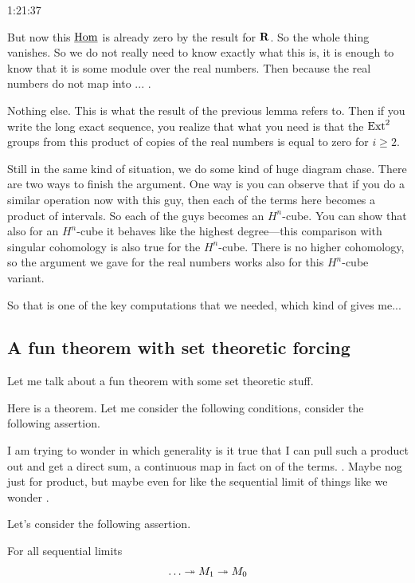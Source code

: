 \begin{unfinished}{1:21:37}
\begin{sketch}
But now this $\operatorname{\underline{Hom}}$ is already zero by the result for $\mathbf R$. So the whole thing vanishes. 
So we do not really need to know exactly what this is, it is enough to know that it is some module over the real numbers. Then because the real numbers do not map into ... .

\end{sketch}


Nothing else. This is what the result of the previous lemma refers to. Then if you write the long exact sequence, you realize that what you need is that the $\operatorname{Ext}^2$ groups from this product of copies of the real numbers is equal to zero for $i \geq 2$.

Still in the same kind of situation, we do some kind of huge diagram chase. There are two ways to finish the argument. One way is you can observe that if you do a similar operation now with this guy, then each of the terms here becomes a product of intervals. So each of the guys becomes an $H^n$-cube.
You can show that also for an $H^n$-cube it behaves like the highest degree---this comparison with singular cohomology is also true for the $H^n$-cube. There is no higher cohomology, so the argument we gave for the real numbers works also for this $H^n$-cube variant.

So that is one of the key computations that we needed, which kind of gives me...

\subsection{A fun theorem with set theoretic forcing}

Let me talk about a fun theorem with some set theoretic stuff.

Here is a theorem. Let me consider the following conditions, consider the following assertion.

I am trying to wonder in which generality is it true that I can pull such a product out and get a direct sum, a continuous map 
in fact on of the terms. .
Maybe nog just for product, but maybe even for like the sequential limit of things like we wonder .

Let's consider the following assertion.

\begin{theorem} \label{theorem:04-star}
For all sequential limits 
\begin{align*}
\ldots \twoheadrightarrow M_1 \twoheadrightarrow M_0
\end{align*}


\end{theorem}
\end{unfinished}
